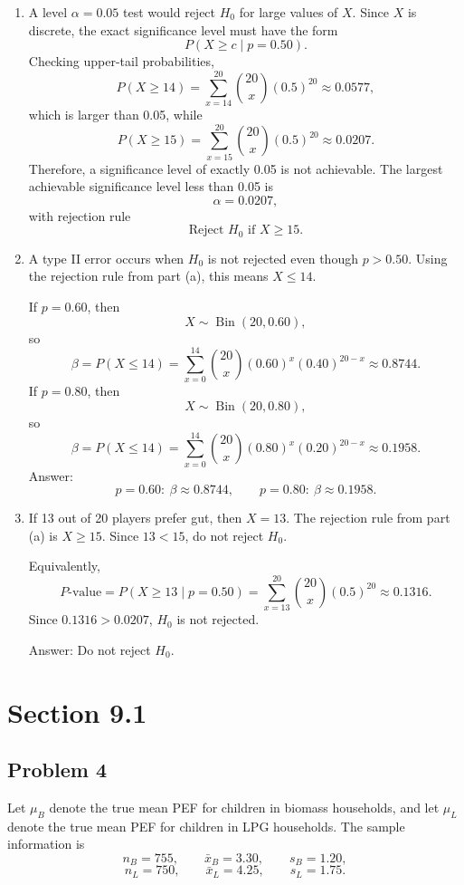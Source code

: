 \documentclass[11pt]{article}
\begin{document}
\begin{enumerate}
\item[(a)] A level $\alpha=0.05$ test would reject $H_0$ for large values of $X$. Since $X$ is discrete, the exact significance level must have the form
\[
P(X\ge c\mid p=0.50).
\]
Checking upper-tail probabilities,
\[
P(X\ge 14)=\sum_{x=14}^{20}\binom{20}{x}(0.5)^{20}\approx 0.0577,
\]
which is larger than 0.05, while
\[
P(X\ge 15)=\sum_{x=15}^{20}\binom{20}{x}(0.5)^{20}\approx 0.0207.
\]
Therefore, a significance level of exactly 0.05 is not achievable. The largest achievable significance level less than 0.05 is
\[
\alpha=0.0207,
\]
with rejection rule
\[
\text{Reject }H_0\text{ if }X\ge 15.
\]

\item[(b)] A type II error occurs when $H_0$ is not rejected even though $p>0.50$. Using the rejection rule from part (a), this means $X\le 14$.

If $p=0.60$, then
\[
X\sim \operatorname{Bin}(20,0.60),
\]
so
\[
\beta=P(X\le 14)=\sum_{x=0}^{14}\binom{20}{x}(0.60)^x(0.40)^{20-x}\approx 0.8744.
\]
If $p=0.80$, then
\[
X\sim \operatorname{Bin}(20,0.80),
\]
so
\[
\beta=P(X\le 14)=\sum_{x=0}^{14}\binom{20}{x}(0.80)^x(0.20)^{20-x}\approx 0.1958.
\]
Answer:
\[
p=0.60:\ \beta\approx 0.8744,
\qquad
p=0.80:\ \beta\approx 0.1958.
\]

\item[(c)] If 13 out of 20 players prefer gut, then $X=13$. The rejection rule from part (a) is $X\ge 15$. Since $13<15$, do not reject $H_0$.

Equivalently,
\[
P\text{-value}=P(X\ge 13\mid p=0.50)
=\sum_{x=13}^{20}\binom{20}{x}(0.5)^{20}
\approx 0.1316.
\]
Since $0.1316>0.0207$, $H_0$ is not rejected.

Answer: Do not reject $H_0$.
\end{enumerate}

\section*{Section 9.1}

\subsection*{Problem 4}

Let $\mu_B$ denote the true mean PEF for children in biomass households, and let $\mu_L$ denote the true mean PEF for children in LPG households. The sample information is
\[
n_B=755,
\qquad \bar{x}_B=3.30,
\qquad s_B=1.20,
\]
\[
n_L=750,
\qquad \bar{x}_L=4.25,
\qquad s_L=1.75.
\]
\end{document}
